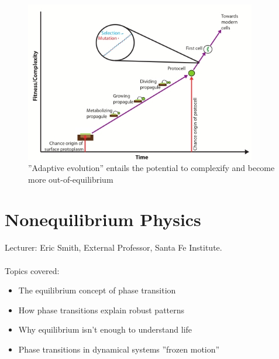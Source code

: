 \documentclass[]{article}
\begin{document}
\begin{figure}[H]
	\caption{''Adaptive evolution'' entails the potential to complexify and become more out-of-equilibrium}\label{fig:AdaptiveEvolution} 
	\includegraphics[width=0.9\textwidth]{AdaptiveEvolution}
\end{figure}

\section{Nonequilibrium Physics}

Lecturer: Eric Smith, External Professor, Santa Fe Institute.\\
\\
Topics covered:
\begin{itemize}
	\item The equilibrium concept of phase transition
	
	\item How phase transitions explain robust patterns
	
	\item Why equilibrium isn’t enough to understand life
	\item Phase transitions in dynamical systems ''frozen motion''
\end{itemize}
\end{document}
